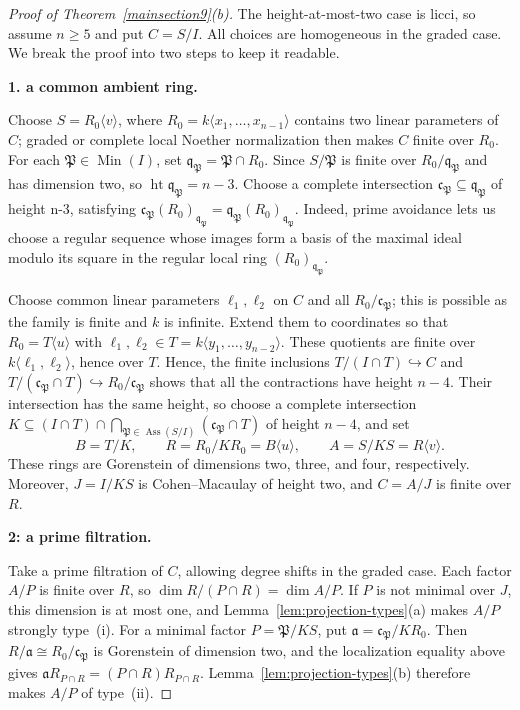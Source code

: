 \documentclass[11pt,letterpaper]{amsart}
\DeclareMathOperator{\Ass}{Ass}
\theoremstyle{plain}
\theoremstyle{definition}
\theoremstyle{remark}
\begin{document}
\begin{proof}[Proof of Theorem~\ref{mainsection9}(b)]
The height-at-most-two case is licci, so assume $n\geq5$ and put $C=S/I$. All choices are homogeneous in the graded case. We break the proof into two steps to keep it readable.

\textbf{ 1. a common ambient ring.}

Choose $S=R_0\langle v\rangle$, where $R_0=k\langle x_1,\ldots,x_{n-1}\rangle$ contains two linear parameters of $C$; graded or complete local Noether normalization then makes $C$ finite over $R_0$. For each $\mathfrak P\in\operatorname{Min}(I)$, set $\mathfrak q_{\mathfrak P}=\mathfrak P\cap R_0$. Since $S/\mathfrak P$ is finite over $R_0/\mathfrak q_{\mathfrak P}$ and has dimension two, so $\operatorname{ht}\mathfrak q_{\mathfrak P}=n-3$. Choose a complete intersection $\mathfrak c_{\mathfrak P}\subseteq\mathfrak q_{\mathfrak P}$ of height n-3, satisfying $\mathfrak c_{\mathfrak P}(R_0)_{\mathfrak q_{\mathfrak P}}=\mathfrak q_{\mathfrak P}(R_0)_{\mathfrak q_{\mathfrak P}}$. Indeed, prime avoidance lets us choose a regular sequence whose images form a basis of the maximal ideal modulo its square in the regular local ring $(R_0)_{\mathfrak q_{\mathfrak P}}$.

Choose common linear parameters $\ell_1,\ell_2$ on $C$ and all $R_0/\mathfrak c_{\mathfrak P}$; this is possible as the family is finite and $k$ is infinite. Extend them to coordinates so that $R_0=T\langle u\rangle$ with $\ell_1,\ell_2\in T=k\langle y_1,\ldots,y_{n-2}\rangle$. These quotients are finite over $k\langle\ell_1,\ell_2\rangle$, hence over $T$. Hence, the finite inclusions $T/(I\cap T)\hookrightarrow C$ and $T/(\mathfrak c_{\mathfrak P}\cap T)\hookrightarrow R_0/\mathfrak c_{\mathfrak P}$ shows that all the contractions have height $n-4$. Their intersection has the same height, so choose a complete intersection $K\subseteq(I\cap T)\cap\bigcap_{\mathfrak P\in\Ass(S/I)}(\mathfrak c_{\mathfrak P}\cap T)$ of height $n-4$, and set
\[
B=T/K,\qquad R=R_0/KR_0=B\langle u\rangle,\qquad A=S/KS=R\langle v\rangle.
\]
These rings are Gorenstein of dimensions two, three, and four, respectively. Moreover, $J=I/KS$ is Cohen--Macaulay of height two, and $C=A/J$ is finite over $R$.

\textbf{2: a prime filtration.}

Take a prime filtration of $C$, allowing degree shifts in the graded case. Each factor $A/P$ is finite over $R$, so $\dim R/(P\cap R)=\dim A/P$. If $P$ is not minimal over $J$, this dimension is at most one, and Lemma~\ref{lem:projection-types}(a) makes $A/P$ strongly type~(i). For a minimal factor $P=\mathfrak P/KS$, put $\mathfrak a=\mathfrak c_{\mathfrak P}/KR_0$. Then $R/\mathfrak a\cong R_0/\mathfrak c_{\mathfrak P}$ is Gorenstein of dimension two, and the localization equality above gives $\mathfrak aR_{P\cap R}=(P\cap R)R_{P\cap R}$. Lemma~\ref{lem:projection-types}(b) therefore makes $A/P$ of type~(ii).


\end{proof}
\end{document}
